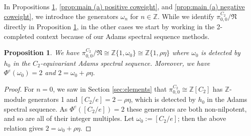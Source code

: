 \documentclass[psamsfonts]{amsart}
\newcommand{\C}{\mathbb C}
\newcommand{\Z}{\mathbb Z}
\newcommand{\fN}{\mathfrak N}
\newcommand{\Ext}{\mathrm {Ext}}
\newtheorem{proposition}[theorem]{Proposition}
\theoremstyle{definition}
\theoremstyle{remark}
\newcommand{\eva}[1]
   {{\color{Periwinkle}\it #1}}
\numberwithin{equation}{section}
\begin{document}



In Propositions \ref{prop:00}, \ref{prop:main (a) positive coweight}, and \ref{prop:main (a) negative coweight}, we introduce the generators $\omega_n$ for $n\in \Z$. While we identify $\pi_{0,0}^{C_2}/\fN$ directly in Proposition \ref{prop:00}, in the other cases we start by working in the 2-completed context because of our Adams spectral sequence methods.
\begin{proposition}\label{prop:00}
We have $\pi_{0,0}^{C_2}/\fN \cong \Z\{1,\omega_0\}\cong \Z\{ 1,\rho\eta \}$ where $\omega_0$ is detected
by $h_0$ in the $C_2$-equivariant Adams spectral sequence. Moreover, we have $\Phi^e(\omega_0)=2$ and $2 = \omega_0 + \rho\eta$.
\end{proposition}
\begin{proof}
For $n=0$, we saw in Section \ref{sec:elements} that $\pi_{0,0}^{C_2} \cong \Z[C_2]$ has $\Z$-module generators 1 and $[C_2/e]= 2-\rho\eta$, which is detected by $h_0$ in the Adams spectral sequence. As $\Phi^e([C_2/e])=2$ these generators are both non-nilpotent, and so are all of their integer multiples.
Let $\omega_0:= [C_2/e]$; then the above relation gives $2 = \omega_0 + \rho\eta$.
\end{proof}
\end{document}
